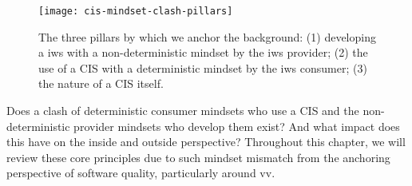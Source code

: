 \begin{figure}[hbt]
  \centering
  \texttt{[image: cis-mindset-clash-pillars]}
  \caption[Mindset clashes within the development, use and nature of a CIS]{The three pillars by which we anchor the background: (1) developing a \gls{iws} with a non-deterministic mindset by the \gls{iws} provider; (2) the use of a CIS with a deterministic mindset by the \gls{iws} consumer; (3) the nature of a CIS itself.}
  \label{fig:background:preface:cis-mindset-clash-pillars}
\end{figure}

Does a clash of deterministic consumer mindsets who use a CIS and the non-deterministic provider mindsets who develop them exist? And what impact does this have on the inside and outside perspective? Throughout this chapter, we will review these core principles due to such  mindset mismatch from the anchoring perspective of software quality, particularly around \gls{vv}.
